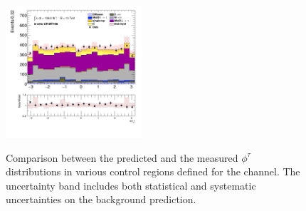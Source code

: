 \begin{figure}[!htp]
\begin{center}
			\includegraphics[width=0.45\textwidth]{chapters/chapter6_HPlus/images/taujets/tau_0_phi_BVETO_MT100.png} \\
			\end{center}
			\caption{
			Comparison between the predicted and the measured $\phi^{\tau}$ distributions in various control regions defined for the \taujets channel. The uncertainty band includes both statistical and systematic uncertainties on the background prediction. 
			}
			\label{fig:bkg-tau-phi-taujets}
		\end{figure}

